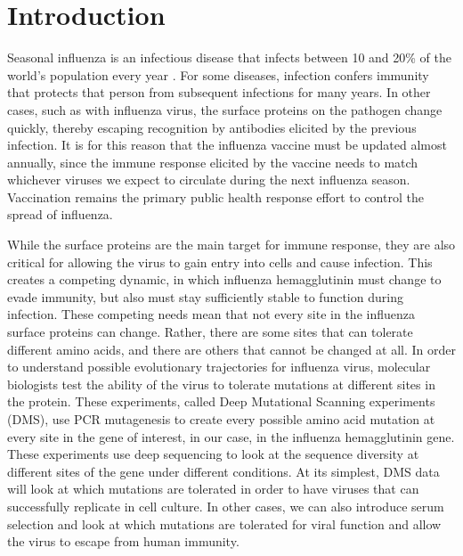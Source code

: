 \documentclass[sigchi]{acmart}
\begin{document}



\section{Introduction}

Seasonal influenza is an infectious disease that infects between 10 and 20\% of the world's population every year \cite{neher2015nextflu}.
For some diseases, infection confers immunity that protects that person from subsequent infections for many years.
In other cases, such as with influenza virus, the surface proteins on the pathogen change quickly, thereby escaping recognition by antibodies elicited by the previous infection.
It is for this reason that the influenza vaccine must be updated almost annually, since the immune response elicited by  the vaccine needs to match whichever viruses we expect to circulate during the next influenza season.
Vaccination remains the primary public health response effort to control the spread of influenza.

While the surface proteins are the main target for immune response, they are also critical for allowing the virus to gain entry into cells and cause infection.
This creates a competing dynamic, in which influenza hemagglutinin must change to evade immunity, but also must stay sufficiently stable to function during infection.
These competing needs mean that not every site in the influenza surface proteins can change.
Rather, there are some sites that can tolerate different amino acids, and there are others that cannot be changed at all.
In order to understand possible evolutionary trajectories for influenza virus, molecular biologists test the ability of the virus to tolerate mutations at different sites in the protein.
These experiments, called Deep Mutational Scanning experiments (DMS), use PCR mutagenesis to create every possible amino acid mutation at every site in the gene of interest, in our case, in the influenza hemagglutinin gene.
These experiments use deep sequencing to look at the sequence diversity at different sites of the gene under different conditions.
At its simplest, DMS data will look at which mutations are tolerated in order to have viruses that can successfully replicate in cell culture.
In other cases, we can also introduce serum selection and look at which mutations are tolerated for viral function and allow the virus to escape from human immunity.
\end{document}
